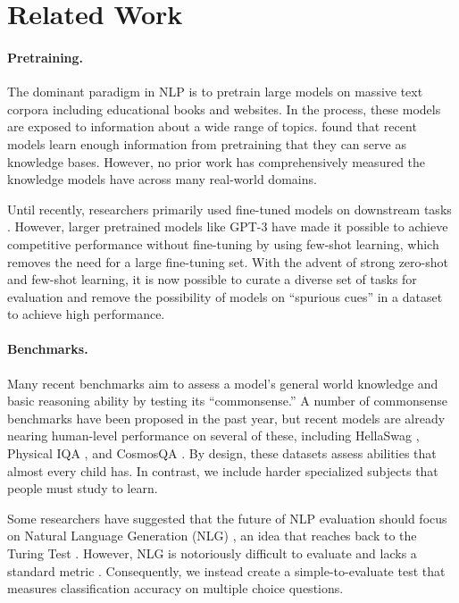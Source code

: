 \section{Related Work}
\paragraph{Pretraining.} 
The dominant paradigm in NLP is to pretrain large models on massive text corpora including educational books and websites. In the process, these models are exposed to information about a wide range of topics.
\citet{petroni2019languagemodelsasknowledgebase} found that recent models learn enough information from pretraining that they can serve as knowledge bases.
However, no prior work has comprehensively measured the knowledge models have across many real-world domains. 

Until recently, researchers primarily used fine-tuned models on downstream tasks \citep{BERTDevlin2019}. However, larger pretrained models like GPT-3 \citep{brown2020gpt3} have made it possible to achieve competitive performance without fine-tuning by using few-shot learning, which removes the need for a large fine-tuning set. With the advent of strong zero-shot and few-shot learning, it is now possible to curate a diverse set of tasks for evaluation and remove the possibility of models on ``spurious cues'' \citep{geirhos2020shortcut,Hendrycks2019NaturalAE} in a dataset to achieve high performance.

\paragraph{Benchmarks.} 
Many recent benchmarks aim to assess a model's general world knowledge and basic reasoning ability by testing its ``commonsense.'' A number of commonsense benchmarks have been proposed in the past year, but recent models are already nearing human-level performance on several of these, including HellaSwag \citep{zellers2019hellaswag}, Physical IQA \citep{bisk2019physicaliqa}, and CosmosQA \citep{huang2019cosmosqa}. By design, these datasets assess abilities that almost every child has. In contrast, we include harder specialized subjects that people must study to learn. 

Some researchers have suggested that the future of NLP evaluation should focus on Natural Language Generation (NLG) \citep{zellers2020turingadvice}, an idea that reaches back to the Turing Test \citep{Turing1990TuringTest}. However, NLG is notoriously difficult to evaluate and lacks a standard metric \citep{Sai2020NLGSurvey}. Consequently, we instead create a simple-to-evaluate test that measures classification accuracy on multiple choice questions.

